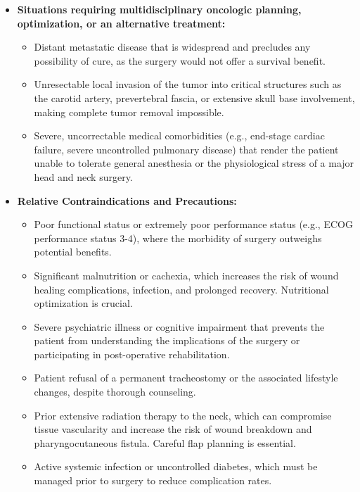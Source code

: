\begin{itemize}
  \item \textbf{Situations requiring multidisciplinary oncologic planning, optimization, or an alternative treatment:}
    \begin{itemize}
      \item Distant metastatic disease that is widespread and precludes any possibility of cure, as the surgery would not offer a survival benefit.
      \item Unresectable local invasion of the tumor into critical structures such as the carotid artery, prevertebral fascia, or extensive skull base involvement, making complete tumor removal impossible.
      \item Severe, uncorrectable medical comorbidities (e.g., end-stage cardiac failure, severe uncontrolled pulmonary disease) that render the patient unable to tolerate general anesthesia or the physiological stress of a major head and neck surgery.
    \end{itemize}

  \item \textbf{Relative Contraindications and Precautions:}
    \begin{itemize}
      \item Poor functional status or extremely poor performance status (e.g., ECOG performance status 3-4), where the morbidity of surgery outweighs potential benefits.
      \item Significant malnutrition or cachexia, which increases the risk of wound healing complications, infection, and prolonged recovery. Nutritional optimization is crucial.
      \item Severe psychiatric illness or cognitive impairment that prevents the patient from understanding the implications of the surgery or participating in post-operative rehabilitation.
      \item Patient refusal of a permanent tracheostomy or the associated lifestyle changes, despite thorough counseling.
      \item Prior extensive radiation therapy to the neck, which can compromise tissue vascularity and increase the risk of wound breakdown and pharyngocutaneous fistula. Careful flap planning is essential.
      \item Active systemic infection or uncontrolled diabetes, which must be managed prior to surgery to reduce complication rates.
    \end{itemize}
\end{itemize}


